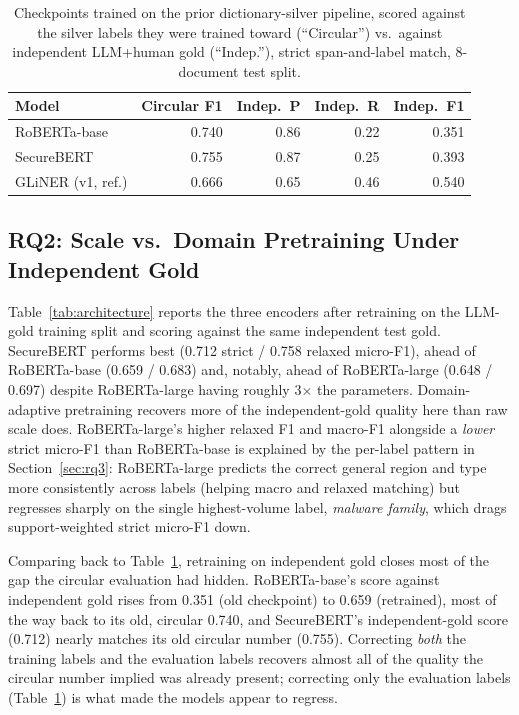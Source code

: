 \documentclass[11pt]{article}
\begin{document}
\begin{table}[t]
\centering
\scriptsize
\setlength{\tabcolsep}{3pt}
\begin{tabular}{lrrrr}
\toprule
Model & Circular F1 & Indep.\ P & Indep.\ R & Indep.\ F1 \\
\midrule
RoBERTa-base & 0.740 & 0.86 & 0.22 & 0.351 \\
SecureBERT & 0.755 & 0.87 & 0.25 & 0.393 \\
GLiNER (v1, ref.) & 0.666 & 0.65 & 0.46 & 0.540 \\
\bottomrule
\end{tabular}
\caption{Checkpoints trained on the prior dictionary-silver pipeline, scored
against the silver labels they were trained toward (``Circular'') vs.\
against independent LLM+human gold (``Indep.''), strict span-and-label
match, 8-document test split.}
\label{tab:circular-vs-independent}
\end{table}

\subsection{RQ2: Scale vs.\ Domain Pretraining Under Independent Gold}

Table~\ref{tab:architecture} reports the three encoders after retraining on
the LLM-gold training split and scoring against the same independent test
gold. SecureBERT performs best (0.712 strict / 0.758 relaxed micro-F1),
ahead of RoBERTa-base (0.659 / 0.683) and, notably, ahead of RoBERTa-large
(0.648 / 0.697) despite RoBERTa-large having roughly 3$\times$ the
parameters. Domain-adaptive pretraining recovers more of the
independent-gold quality here than raw scale does. RoBERTa-large's higher
relaxed F1 and macro-F1 alongside a \emph{lower} strict micro-F1 than
RoBERTa-base is explained by the per-label pattern in
Section~\ref{sec:rq3}: RoBERTa-large predicts the correct general region and
type more consistently across labels (helping macro and relaxed matching)
but regresses sharply on the single highest-volume label, \emph{malware
family}, which drags support-weighted strict micro-F1 down.

Comparing back to Table~\ref{tab:circular-vs-independent}, retraining on
independent gold closes most of the gap the circular evaluation had hidden.
RoBERTa-base's score against independent gold rises from 0.351 (old
checkpoint) to 0.659 (retrained), most of the way back to its old,
circular 0.740, and SecureBERT's independent-gold score (0.712) nearly
matches its old circular number (0.755). Correcting \emph{both} the
training labels and the evaluation labels recovers almost all of the
quality the circular number implied was already present; correcting only
the evaluation labels (Table~\ref{tab:circular-vs-independent}) is what
made the models appear to regress.
\end{document}
